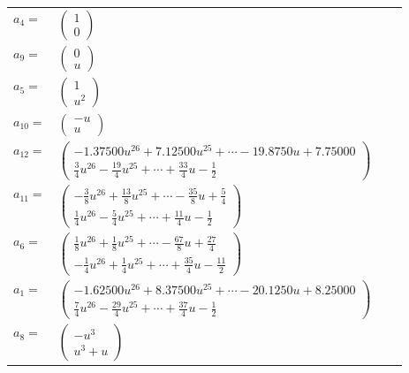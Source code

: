 \documentclass[1p]{elsarticle_modified}
\theoremstyle{definition}
\begin{document}
\begin{tabular}{m{7pt} m{180pt} m{7pt} m{180pt} }
\flushright $a_{4}=$&$\begin{pmatrix}1\\0\end{pmatrix}$ \\
\flushright $a_{9}=$&$\begin{pmatrix}0\\u\end{pmatrix}$ \\
\flushright $a_{5}=$&$\begin{pmatrix}1\\u^2\end{pmatrix}$ \\
\flushright $a_{10}=$&$\begin{pmatrix}- u\\u\end{pmatrix}$ \\
\flushright $a_{12}=$&$\begin{pmatrix}-1.37500 u^{26}+7.12500 u^{25}+\cdots-19.8750 u+7.75000\\\frac{3}{4} u^{26}-\frac{19}{4} u^{25}+\cdots+\frac{33}{4} u-\frac{1}{2}\end{pmatrix}$ \\
\flushright $a_{11}=$&$\begin{pmatrix}-\frac{3}{8} u^{26}+\frac{13}{8} u^{25}+\cdots-\frac{35}{8} u+\frac{5}{4}\\\frac{1}{4} u^{26}-\frac{5}{4} u^{25}+\cdots+\frac{11}{4} u-\frac{1}{2}\end{pmatrix}$ \\
\flushright $a_{6}=$&$\begin{pmatrix}\frac{1}{8} u^{26}+\frac{1}{8} u^{25}+\cdots-\frac{67}{8} u+\frac{27}{4}\\-\frac{1}{4} u^{26}+\frac{1}{4} u^{25}+\cdots+\frac{35}{4} u-\frac{11}{2}\end{pmatrix}$ \\
\flushright $a_{1}=$&$\begin{pmatrix}-1.62500 u^{26}+8.37500 u^{25}+\cdots-20.1250 u+8.25000\\\frac{7}{4} u^{26}-\frac{29}{4} u^{25}+\cdots+\frac{37}{4} u-\frac{1}{2}\end{pmatrix}$ \\
\flushright $a_{8}=$&$\begin{pmatrix}- u^3\\u^3+u\end{pmatrix}$ \\

\end{tabular}
\end{document}
